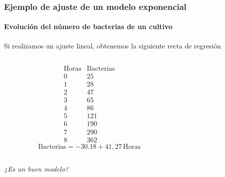 \begin{frame}
\frametitle{Ejemplo de ajuste de un modelo exponencial}
\framesubtitle{Evolución del número de bacterias de un cultivo}
Si realizamos un ajuste lineal, obtenemos la siguiente recta de regresión
\begin{columns}
\begin{column}{0.3\textwidth}
\[
\begin{array}{c|c}
\mbox{Horas} & \mbox{Bacterias}\\
\hline
0 &  25 \\
1 & 28 \\
2 &  47\\
3 & 65 \\
4 & 86\\
5 & 121\\
6 & 190\\
7 & 290\\
8 & 362
\end{array}
\]
\[
\mbox{Bacterias} = -30.18+41,27\,\mbox{Horas}
\]
\end{column}
\begin{column}{0.6\textwidth}
\begin{center}
\scalebox{0.6}{}
\end{center}
\end{column}
\end{columns}
\begin{center}
\emph{¿Es un buen modelo?}
\end{center}

\end{frame}


